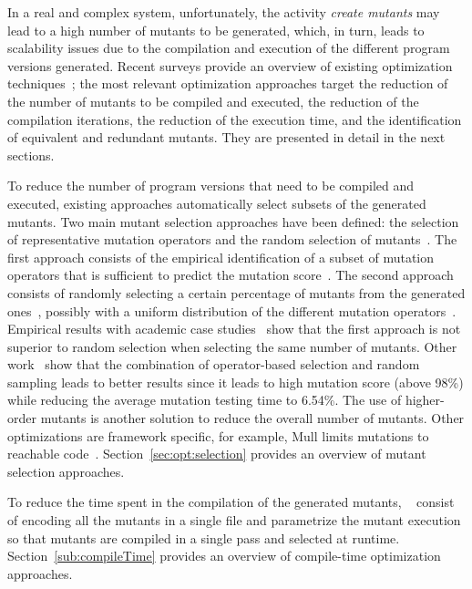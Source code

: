 In a real and complex system, unfortunately, the activity \emph{create mutants} may lead to a high number of mutants to be generated, which, in turn, leads to scalability issues due to the compilation and execution of the different program versions generated. Recent surveys provide an overview of existing optimization techniques~\cite{ferrari2018systematic};
the most relevant optimization approaches target the reduction of the number of mutants to be compiled and executed, 
the reduction of the compilation iterations, the reduction of the execution time, and the identification of equivalent and redundant mutants. They are presented in detail in the next sections.

To reduce the number of program versions that need to be compiled and executed, existing approaches automatically select subsets of the generated mutants. Two main mutant selection approaches have been defined: the selection of representative mutation operators and the random selection of mutants~\cite{zhang2010operator}. The first approach consists of the empirical identification of a subset of mutation operators that is sufficient to predict the mutation score~\cite{siami2008sufficient,barbosa2001toward}. The second approach consists of randomly selecting a certain percentage of mutants from the generated ones~\cite{wong1995reducing}, possibly with a uniform distribution of the different mutation operators~\cite{zhang2010operator}. Empirical results with academic case studies~\cite{zhang2010operator} show that the first approach is not superior to random selection when selecting the same number of mutants. Other work~\cite{zhang2013operator} show that the combination of operator-based selection and random sampling leads to better results since it leads to high mutation score (above 98\%) while reducing the average mutation testing time to 6.54\%. The use of higher-order mutants is another solution to reduce the overall number of mutants. 
Other optimizations are framework specific, for example, Mull limits mutations to reachable code~\cite{hariri2018srciror}. Section~\ref{sec:opt:selection} provides an overview of mutant selection approaches.

To reduce the time spent in the compilation of the generated mutants, ~\cite{untch1993mutation} consist of encoding all the mutants in a single file and parametrize the mutant execution so that mutants are compiled in a single pass and selected at runtime. Section~\ref{sub:compileTime} provides an overview of compile-time optimization approaches.

